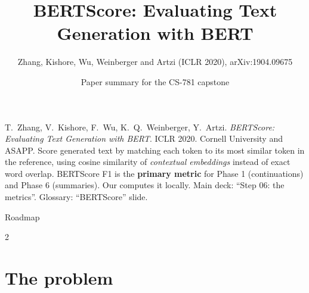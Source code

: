 \documentclass[aspectratio=169,11pt]{beamer}
\title[BERTScore]{BERTScore: Evaluating Text Generation with BERT}
\subtitle{Zhang, Kishore, Wu, Weinberger and Artzi (ICLR 2020), arXiv:1904.09675}
\author[Paper summary]{Paper summary for the CS-781 capstone}
\date{}
\begin{document}
\begin{frame}\titlepage\end{frame}

\paperglance
{T.\ Zhang, V.\ Kishore, F.\ Wu, K.\ Q.\ Weinberger, Y.\ Artzi. \emph{BERTScore: Evaluating Text Generation with BERT}. ICLR 2020. Cornell University and ASAPP.}
{Score generated text by matching each token to its most similar token in the reference, using cosine similarity of \emph{contextual embeddings} instead of exact word overlap.}
{BERTScore F1 is the \textbf{primary metric} for Phase 1 (continuations) and Phase 6 (summaries). Our  computes it locally.}
{Main deck: ``Step 06: the metrics''. Glossary: ``BERTScore'' slide.}

\begin{frame}{Roadmap}
  \begin{multicols}{2}\small\tableofcontents\end{multicols}
\end{frame}

\section{The problem}
\end{document}
